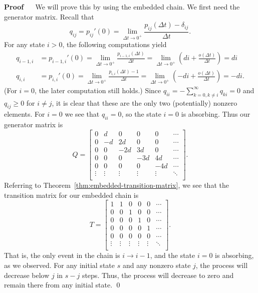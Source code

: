 \documentclass[12pt]{article}
\renewenvironment{proof}{%
\begin{adjustwidth}{\parindent}{\parindent}
{\bf Proof} \ \ 
}{\qed
\end{adjustwidth}}
\theoremstyle{definition}
\begin{document}
\begin{proof}
We will prove this by using the embedded chain. We first need the generator
matrix. Recall that $$q_{ij} = p_{ij}'(0) = \lim_{\Delta t \to 0^+}
\frac{p_{ij}(\Delta t) - \delta_{ij}}{\Delta t}.$$ For any state $i > 0$, the
following computations yield
\begin{align*}
    q_{i - 1, i} &= p_{i - 1, i}'(0)
        = \lim_{\Delta t \to 0^+} \frac{p_{i - 1, i}(\Delta t)}{\Delta t}
        = \lim_{\Delta t \to 0^+}
            \left( di + \frac{o(\Delta t)}{\Delta t} \right) = di \\
%
    q_{i, i} &= p_{i, i}'(0)
        = \lim_{\Delta t \to 0^+} \frac{p_{i, i}(\Delta t) - 1}{\Delta t}
        = \lim_{\Delta t \to 0^+}
            \left( -di + \frac{o(\Delta t)}{\Delta t} \right) = -di.
\end{align*}
(For $i = 0$, the later computation still holds.) Since $q_{ii} = -\sum_{k = 0,
k \neq i}^\infty q_{ki} = 0$ and $q_{ij} \geq 0$ for $i \neq j$, it is clear
that these are the only two (potentially) nonzero elements. For $i = 0$ we see
that $q_{ii} = 0$, so the state $i = 0$ is absorbing. Thus our generator matrix
is \[ Q =
    \begin{bmatrix}
        0 & d & 0 & 0 & 0 & \cdots \\
        0 & -d & 2d & 0 & 0 & \cdots \\
        0 & 0 & -2d & 3d & 0 & \cdots \\
        0 & 0 & 0 & -3d & 4d & \cdots \\
        0 & 0 & 0 & 0 & -4d & \cdots \\
        \vdots & \vdots & \vdots & \vdots & \vdots & \ddots \\
    \end{bmatrix}.
\]
Referring to Theorem~\ref{thm:embedded-transition-matrix}, we see that the
transition matrix for our embedded chain is
\[
    T =
    \begin{bmatrix}
        1 & 1 & 0 & 0 & 0 & \cdots \\
        0 & 0 & 1 & 0 & 0 & \cdots \\
        0 & 0 & 0 & 1 & 0 & \cdots \\
        0 & 0 & 0 & 0 & 1 & \cdots \\
        0 & 0 & 0 & 0 & 0 & \cdots \\
        \vdots & \vdots & \vdots & \vdots & \vdots & \ddots \\
    \end{bmatrix}.
\]
That is, the only event in the chain is $i \to i - 1$, and the state $i = 0$ is
absorbing, as we observed. For any initial state $s$ and any nonzero state $j$,
the process will decrease below $j$ in $s - j$ steps. Thus, the process will
decrease to zero and remain there from any initial state.
\end{proof}
\end{document}
